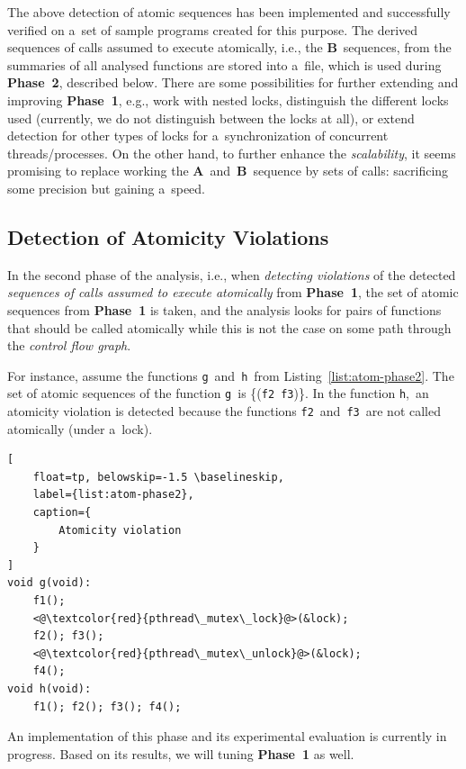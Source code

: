 \documentclass{ExcelAtFIT}
\begin{document}
The above detection of atomic sequences
has been implemented and successfully verified
on a~set of sample programs created for
this purpose. The derived sequences of calls
assumed to execute atomically, i.e.,
the \textbf{B}~sequences, from the summaries
of all analysed functions are stored into a~file,
which is used during \textbf{Phase~2},
described below. There are some
possibilities for further extending and
improving \textbf{Phase~1}, e.g.,
work with nested locks, distinguish the
different locks used (currently, we do not
distinguish between the locks at all),
or extend detection for other types of
locks for a~synchronization of concurrent
threads/processes. On the other hand,
to further enhance the \emph{scalability},
it seems promising to replace working
the \textbf{A}~and~\textbf{B}~sequence
by sets of calls: sacrificing some precision
but gaining a~speed.

\subsection{Detection of Atomicity Violations}
\label{sec:atomicity-phase2}

In the second phase of the analysis, i.e.,
when \emph{detecting violations} of the detected
\emph{sequences of calls assumed to execute
atomically} from \textbf{Phase~1}, the set
of atomic sequences from \textbf{Phase~1}
is taken, and the analysis looks for pairs
of functions that should be called atomically
while this is not the case on some path
through the \emph{control flow graph}.

For instance, assume the functions
\texttt{g}~and~\texttt{h}~from
Listing~\ref{list:atom-phase2}.
The set of atomic sequences of the
function \texttt{g}~is
\{(\texttt{f2}~\texttt{f3})\}. In the function
\texttt{h},~an atomicity violation is detected
because the functions
\texttt{f2}~and~\texttt{f3}~are not called
atomically (under a~lock).

\begin{lstlisting}[
    float=tp, belowskip=-1.5 \baselineskip,
    label={list:atom-phase2},
    caption={
        Atomicity violation
    }
]
void g(void):
    f1();
    <@\textcolor{red}{pthread\_mutex\_lock}@>(&lock);
    f2(); f3();
    <@\textcolor{red}{pthread\_mutex\_unlock}@>(&lock);
    f4();
void h(void):
    f1(); f2(); f3(); f4();
\end{lstlisting}

An implementation of this phase and its
experimental evaluation is currently in
progress. Based on its results, we will
tuning \textbf{Phase~1} as well.
\end{document}
